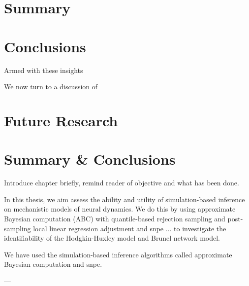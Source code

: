 \chapter{Summary}\label{chap:summary}

\chapter{Conclusions}\label{chap:conclusions}

Armed with these insights

We now turn to a discussion of

\chapter{Future Research}\label{chap:future}


\chapter{Summary \& Conclusions}\label{chap:Conclusion}

Introduce chapter briefly, remind reader of objective and what has been done. 

In this thesis, we aim assess the ability and utility of simulation-based inference on mechanistic models of neural dynamics. We do this by using approximate Bayesian computation (ABC) with quantile-based rejection sampling and post-sampling local linear regression adjustment and snpe ... to investigate the identifiability of the Hodgkin-Huxley model and Brunel network model. 

We have used the simulation-based inference algorithms called approximate Bayesian computation and snpe.

---

